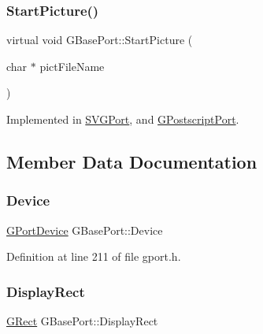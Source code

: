 \subsubsection{\texorpdfstring{Start\+Picture()}{StartPicture()}}
{\footnotesize\ttfamily virtual void G\+Base\+Port\+::\+Start\+Picture (\begin{DoxyParamCaption}\item[{char $\ast$}]{pict\+File\+Name }\end{DoxyParamCaption})\hspace{0.3cm}{\ttfamily [pure virtual]}}



Implemented in \mbox{\hyperlink{class_s_v_g_port_a930228d552d729c5aeb0aa8fb731d303}{S\+V\+G\+Port}}, and \mbox{\hyperlink{class_g_postscript_port_a4c9faebb953228964ca032e75ed40bcc}{G\+Postscript\+Port}}.



\subsection{Member Data Documentation}
\mbox{\label{class_g_base_port_a14275a027c8665d5fa4941e148a1b46a}} 
\subsubsection{\texorpdfstring{Device}{Device}}
{\footnotesize\ttfamily \mbox{\hyperlink{gport_8h_a595e501a3b83fde14c760260fbfb153f}{G\+Port\+Device}} G\+Base\+Port\+::\+Device\hspace{0.3cm}{\ttfamily [protected]}}



Definition at line 211 of file gport.\+h.

\mbox{\label{class_g_base_port_ac0e1180ebadeed5d3c7d0291db1bdf29}} 
\subsubsection{\texorpdfstring{Display\+Rect}{DisplayRect}}
{\footnotesize\ttfamily \mbox{\hyperlink{class_g_rect}{G\+Rect}} G\+Base\+Port\+::\+Display\+Rect\hspace{0.3cm}{\ttfamily [protected]}}




